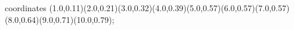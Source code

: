 					coordinates { (1.0,0.11)(2.0,0.21)(3.0,0.32)(4.0,0.39)(5.0,0.57)(6.0,0.57)(7.0,0.57)(8.0,0.64)(9.0,0.71)(10.0,0.79)};
